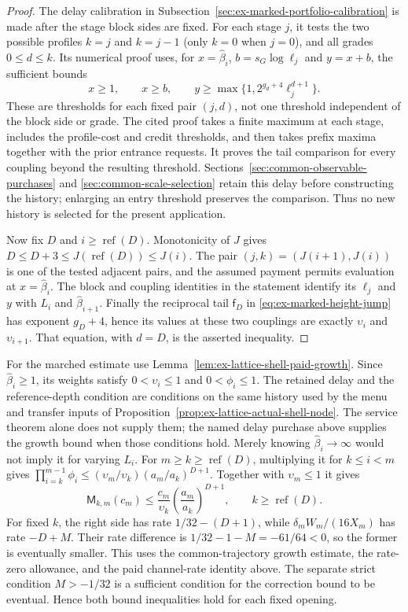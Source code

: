 \begin{proof}
The delay calibration in
Subsection~\ref{sec:ex-marked-portfolio-calibration} is made after the
stage block sides are fixed. For each stage $j$, it tests the two possible
profiles $k=j$ and $k=j-1$ (only $k=0$ when $j=0$), and all grades
$0\le d\le k$. Its numerical proof uses, for
$x=\widehat\beta_i$, $b=s_G\log\ell_j$ and $y=x+b$, the sufficient
bounds
\[
 x\ge1,\qquad x\ge b,\qquad
 y\ge\max\{1,2^{g_d+4}\ell_j^{d+1}\}.
\]
These are thresholds for each fixed pair $(j,d)$, not one threshold
independent of the block side or grade. The cited proof takes a finite
maximum at each stage, includes the profile-cost and credit thresholds,
and then takes prefix maxima together with the prior entrance requests.
It proves the tail comparison for every coupling beyond the resulting
threshold. Sections~\ref{sec:common-observable-purchases} and
\ref{sec:common-scale-selection} retain this delay before constructing
the history; enlarging an entry threshold preserves the comparison.
Thus no new history is selected for the present application.

Now fix $D$ and $i\ge\operatorname{ref}(D)$. Monotonicity of $J$ gives
$D\le D+3\le J(\operatorname{ref}(D))\le J(i)$.
The pair $(j,k)=(J(i+1),J(i))$ is one of the tested adjacent pairs,
and the assumed payment permits evaluation at $x=\widehat\beta_i$.
The block and coupling identities in the statement identify its
$\ell_j$ and $y$ with $L_i$ and $\widehat\beta_{i+1}$.
Finally the reciprocal tail $\mathsf f_D$ in
\eqref{eq:ex-marked-height-jump} has exponent $g_D+4$, hence its values
at these two couplings are exactly $\upsilon_i$ and $\upsilon_{i+1}$.
That equation, with $d=D$, is the asserted inequality.
\end{proof}

For the marched estimate use Lemma~\ref{lem:ex-lattice-shell-paid-growth}.
Since $\widehat\beta_i\ge1$, its weights satisfy
$0<\upsilon_i\le1$ and $0<\phi_i\le1$. The retained delay and the
reference-depth condition are conditions on the same history used by the
menu and transfer inputs of
Proposition~\ref{prop:ex-lattice-actual-shell-node}. The service theorem
alone does not supply them; the named delay purchase above supplies the
growth bound when those conditions hold. Merely knowing
$\widehat\beta_i\to\infty$ would not imply it for varying $L_i$.
For $m\ge k\ge\operatorname{ref}(D)$, multiplying
it for $k\le i<m$ gives
$\prod_{i=k}^{m-1}\phi_i\le
(\upsilon_m/\upsilon_k)(a_m/a_k)^{D+1}$.
Together with $\upsilon_m\leq1$ it gives
\[
 \mathsf M_{k,m}(c_m)\leq
 \frac{c_m}{\upsilon_k}\left(\frac{a_m}{a_k}\right)^{D+1},
 \qquad k\geq\operatorname{ref}(D).
\]
For fixed $k$, the right side has rate $1/32-(D+1)$, while
$\delta_mW_m/(16X_m)$ has rate $-D+M$. Their rate difference is
$1/32-1-M=-61/64<0$, so the former is eventually smaller. This uses
the common-trajectory growth estimate, the rate-zero allowance, and the paid
channel-rate identity above. The separate strict condition $M>-1/32$
is a sufficient condition for the correction bound to be eventual.
Hence both bound
inequalities hold for each fixed opening.

